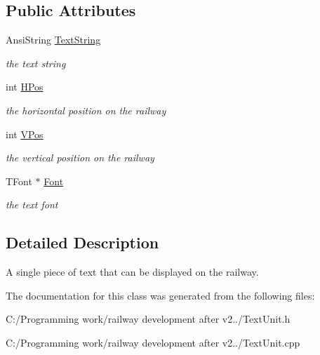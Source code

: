 \subsection*{Public Attributes}
\begin{DoxyCompactItemize}
\item 
\mbox{\label{class_t_text_item_a4c25a60852b8493f06d26e64241aa98f}} 
Ansi\+String \mbox{\hyperlink{class_t_text_item_a4c25a60852b8493f06d26e64241aa98f}{Text\+String}}
\begin{DoxyCompactList}\small\item\em the text string \end{DoxyCompactList}\item 
\mbox{\label{class_t_text_item_a1be1010d3eed8002ab893103a43ffc7b}} 
int \mbox{\hyperlink{class_t_text_item_a1be1010d3eed8002ab893103a43ffc7b}{H\+Pos}}
\begin{DoxyCompactList}\small\item\em the horizontal position on the railway \end{DoxyCompactList}\item 
\mbox{\label{class_t_text_item_a7fc4c3a7d8583931e2ac595006550f9c}} 
int \mbox{\hyperlink{class_t_text_item_a7fc4c3a7d8583931e2ac595006550f9c}{V\+Pos}}
\begin{DoxyCompactList}\small\item\em the vertical position on the railway \end{DoxyCompactList}\item 
\mbox{\label{class_t_text_item_a0960b6aa95ed04a4e7bc9131dd6e879e}} 
T\+Font $\ast$ \mbox{\hyperlink{class_t_text_item_a0960b6aa95ed04a4e7bc9131dd6e879e}{Font}}
\begin{DoxyCompactList}\small\item\em the text font \end{DoxyCompactList}\end{DoxyCompactItemize}


\subsection{Detailed Description}
A single piece of text that can be displayed on the railway. 

The documentation for this class was generated from the following files\+:\begin{DoxyCompactItemize}
\item 
C\+:/\+Programming work/railway development after v2../Text\+Unit.\+h\item 
C\+:/\+Programming work/railway development after v2../Text\+Unit.\+cpp\end{DoxyCompactItemize}
